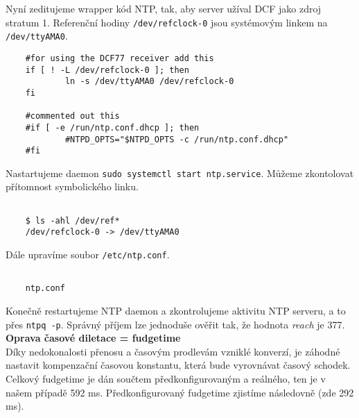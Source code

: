     Nyní zeditujeme wrapper kód NTP, tak, aby server užíval DCF jako zdroj stratum 1.
    Referenční hodiny \verb|/dev/refclock-0| jsou systémovým linkem na
    \verb|/dev/ttyAMA0|.

    \vspace{1em}

    \begin{lstlisting}
    #for using the DCF77 receiver add this
    if [ ! -L /dev/refclock-0 ]; then
            ln -s /dev/ttyAMA0 /dev/refclock-0
    fi

    #commented out this
    #if [ -e /run/ntp.conf.dhcp ]; then
            #NTPD_OPTS="$NTPD_OPTS -c /run/ntp.conf.dhcp"
    #fi
    \end{lstlisting}

    \vspace{1em}

\newpage

    Nastartujeme daemon \verb|sudo systemctl start ntp.service|. Můžeme zkontolovat
    přítomnost symbolického linku.


    \begin{lstlisting}

    $ ls -ahl /dev/ref*
    /dev/refclock-0 -> /dev/ttyAMA0

    \end{lstlisting}

    \vspace{1em}

    Dále upravíme soubor \verb|/etc/ntp.conf|.

    \begin{lstlisting}

    ntp.conf

    \end{lstlisting}

    \vspace{1em}

    Konečně restartujeme NTP daemon a zkontrolujeme aktivitu NTP serveru, a to přes
    \verb|ntpq -p|. Správný příjem lze jednoduše ověřit tak, že hodnota \textit{reach} je
    377.
    \\

    \textbf{Oprava časové diletace = fudgetime}
    \\

    Díky nedokonalosti přenosu a časovým prodlevám vzniklé konverzí, je záhodné nastavit
    kompenzační časovou konstantu, která bude vyrovnávat časový schodek. Celkový fudgetime
    je dán součtem předkonfigurovaným a reálného, ten je v našem případě 592 ms.
    Předkonfigurovaný fudgetime zjistíme následovně (zde 292 ms).

